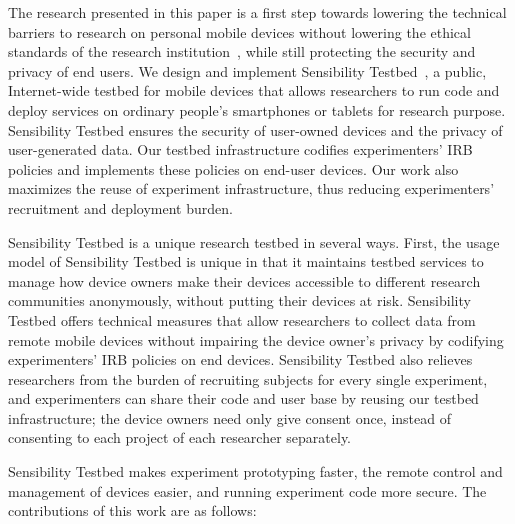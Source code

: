 The research presented in this paper is a first step towards lowering the technical
barriers to research on personal mobile devices without lowering the
ethical standards of the research institution~\cite{zevenbergen2013ethical}, while still 
protecting the security and privacy of end users. We design and implement 
Sensibility Testbed~\cite{sensibility, zhuang2014sensibility}, a 
public, Internet-wide testbed for mobile devices that
allows researchers to run code and deploy services on ordinary
people's smartphones or tablets for research purpose. Sensibility Testbed ensures
the security of user-owned devices and the privacy of
user-generated data. Our testbed 
infrastructure codifies experimenters' IRB policies and 
implements these policies on end-user devices. Our work also 
maximizes the reuse of experiment infrastructure, thus reducing 
experimenters' recruitment and deployment burden. 

Sensibility Testbed is a unique research testbed in several ways.
First, the usage model of Sensibility Testbed is
unique in that it maintains testbed services to manage how device 
owners make their devices accessible to different research 
communities anonymously, without putting
their devices at risk. Sensibility Testbed offers technical measures
that allow researchers to collect data from remote mobile
devices without impairing the device owner's privacy by codifying 
experimenters' IRB policies on end devices. 
Sensibility Testbed also relieves researchers from the burden of
recruiting subjects for every single experiment, and 
experimenters can share their code and user base by reusing
our testbed infrastructure; the device
owners need only give consent once, instead of 
consenting to each project of each researcher separately.

Sensibility Testbed makes experiment
prototyping faster, the remote control and management of devices
easier, and running experiment code more secure. The
contributions of this work are as follows:

